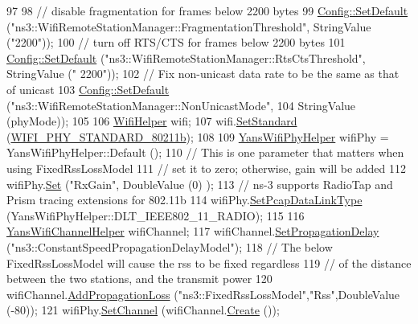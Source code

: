 \begin{DoxyCode}
97 
98   \textcolor{comment}{// disable fragmentation for frames below 2200 bytes}
99   \hyperlink{group__config_ga2e7882df849d8ba4aaad31c934c40c06}{Config::SetDefault} (\textcolor{stringliteral}{"ns3::WifiRemoteStationManager::FragmentationThreshold"}, 
      StringValue (\textcolor{stringliteral}{"2200"}));
100   \textcolor{comment}{// turn off RTS/CTS for frames below 2200 bytes}
101   \hyperlink{group__config_ga2e7882df849d8ba4aaad31c934c40c06}{Config::SetDefault} (\textcolor{stringliteral}{"ns3::WifiRemoteStationManager::RtsCtsThreshold"}, StringValue (\textcolor{stringliteral}{"
      2200"}));
102   \textcolor{comment}{// Fix non-unicast data rate to be the same as that of unicast}
103   \hyperlink{group__config_ga2e7882df849d8ba4aaad31c934c40c06}{Config::SetDefault} (\textcolor{stringliteral}{"ns3::WifiRemoteStationManager::NonUnicastMode"},
104                       StringValue (phyMode));
105 
106   \hyperlink{classns3_1_1WifiHelper}{WifiHelper} wifi;
107   wifi.\hyperlink{classns3_1_1WifiHelper_aa54f3e61527ef8de318d310045bc5dfd}{SetStandard} (\hyperlink{group__wifi_gga1299834f4e1c615af3ca738033b76a49a77e1cc9f77a0bce8e2bc82cbef437b5a}{WIFI\_PHY\_STANDARD\_80211b});
108 
109   \hyperlink{classns3_1_1YansWifiPhyHelper}{YansWifiPhyHelper} wifiPhy =  YansWifiPhyHelper::Default ();
110   \textcolor{comment}{// This is one parameter that matters when using FixedRssLossModel}
111   \textcolor{comment}{// set it to zero; otherwise, gain will be added}
112   wifiPhy.\hyperlink{classns3_1_1WifiPhyHelper_a2527d6d7b29f717fd7436166c5f05f1a}{Set} (\textcolor{stringliteral}{"RxGain"}, DoubleValue (0) );
113   \textcolor{comment}{// ns-3 supports RadioTap and Prism tracing extensions for 802.11b}
114   wifiPhy.\hyperlink{classns3_1_1WifiPhyHelper_ae4b90e90f6e78a19c1b7fdf08b270218}{SetPcapDataLinkType} (YansWifiPhyHelper::DLT\_IEEE802\_11\_RADIO);
115 
116   \hyperlink{classns3_1_1YansWifiChannelHelper}{YansWifiChannelHelper} wifiChannel;
117   wifiChannel.\hyperlink{classns3_1_1YansWifiChannelHelper_a6b452ba53ccaee6ca000cc72ed9ea0fa}{SetPropagationDelay} (\textcolor{stringliteral}{"ns3::ConstantSpeedPropagationDelayModel"});
118   \textcolor{comment}{// The below FixedRssLossModel will cause the rss to be fixed regardless}
119   \textcolor{comment}{// of the distance between the two stations, and the transmit power}
120   wifiChannel.\hyperlink{classns3_1_1YansWifiChannelHelper_a71c64d54e148b43698c65736e1c77156}{AddPropagationLoss} (\textcolor{stringliteral}{"ns3::FixedRssLossModel"},\textcolor{stringliteral}{"Rss"},DoubleValue (-80));
121   wifiPhy.\hyperlink{classns3_1_1YansWifiPhyHelper_ad2e9a27587dd4ff320435c93cc2676de}{SetChannel} (wifiChannel.\hyperlink{classns3_1_1YansWifiChannelHelper_a0532e292ab9452f3cf630c848708e563}{Create} ());

\end{DoxyCode}
